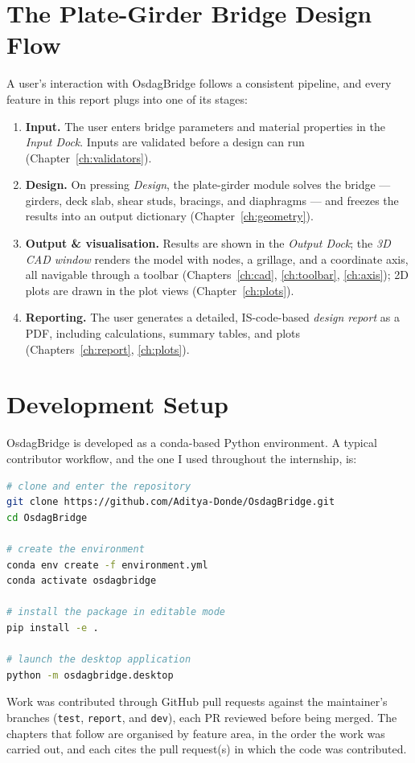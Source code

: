 \section{The Plate-Girder Bridge Design Flow}
A user's interaction with OsdagBridge follows a consistent pipeline, and every feature in this
report plugs into one of its stages:

\begin{enumerate}[leftmargin=1.6em]
  \item \textbf{Input.} The user enters bridge parameters and material properties in the
        \emph{Input Dock}. Inputs are validated before a design can run
        (Chapter~\ref{ch:validators}).
  \item \textbf{Design.} On pressing \emph{Design}, the plate-girder module solves the bridge
        --- girders, deck slab, shear studs, bracings, and diaphragms --- and freezes the
        results into an output dictionary (Chapter~\ref{ch:geometry}).
  \item \textbf{Output \& visualisation.} Results are shown in the \emph{Output Dock}; the
        \emph{3D CAD window} renders the model with nodes, a grillage, and a coordinate axis,
        all navigable through a toolbar (Chapters~\ref{ch:cad}, \ref{ch:toolbar},
        \ref{ch:axis}); 2D plots are drawn in the plot views
        (Chapter~\ref{ch:plots}).
  \item \textbf{Reporting.} The user generates a detailed, IS-code-based \emph{design report}
        as a PDF, including calculations, summary tables, and plots
        (Chapters~\ref{ch:report}, \ref{ch:plots}).
\end{enumerate}


\section{Development Setup}
OsdagBridge is developed as a conda-based Python environment. A typical contributor workflow,
and the one I used throughout the internship, is:

\begin{lstlisting}[language=bash,caption={Local development setup.},label={lst:setup}]
# clone and enter the repository
git clone https://github.com/Aditya-Donde/OsdagBridge.git
cd OsdagBridge

# create the environment
conda env create -f environment.yml
conda activate osdagbridge

# install the package in editable mode
pip install -e .

# launch the desktop application
python -m osdagbridge.desktop
\end{lstlisting}

Work was contributed through GitHub pull requests against the maintainer's branches
(\texttt{test}, \texttt{report}, and \texttt{dev}), each PR reviewed before being merged. The
chapters that follow are organised by feature area, in the order the work was carried out, and
each cites the pull request(s) in which the code was contributed.

